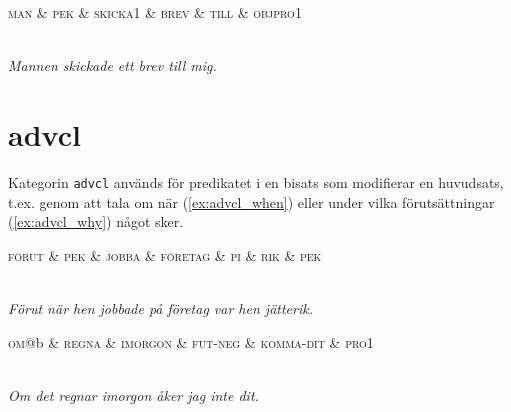 \documentclass[11pt,a4paper]{article}
\begin{document}
\begin{example}
\label{ex:case_obj}
\begin{dependency}[theme = simple]
   \begin{deptext}[column sep=1em]
      \textsc{man} \& \textsc{pek} \& \textsc{skicka1} \& \textsc{brev} \& \textsc{till} \& \textsc{objpro1} \\
   \end{deptext}
\end{dependency}
\\
\textit{Mannen skickade ett brev till mig.}
\end{example}

\section{advcl}
\label{sec:advcl}
Kategorin \texttt{advcl} används för predikatet i en bisats som modifierar en huvudsats, t.ex. genom att tala om när (\ref{ex:advcl_when}) eller under vilka förutsättningar (\ref{ex:advcl_why}) något sker.

\begin{example}
\label{ex:advcl_when}
\begin{dependency}[theme = simple]
   \begin{deptext}[column sep=1em]
      \textsc{förut} \& \textsc{pek} \& \textsc{jobba} \& \textsc{företag} \& \textsc{pi} \& \textsc{rik} \& \textsc{pek} \\
   \end{deptext}
\end{dependency}
\\
\textit{Förut när hen jobbade på företag var hen jätterik.}
\end{example}

\begin{example}
\label{ex:advcl_why}
\begin{dependency}[theme = simple]
   \begin{deptext}[column sep=1em]
      \textsc{om}@b \& \textsc{regna} \& \textsc{imorgon} \& \textsc{fut-neg} \& \textsc{komma-dit} \& \textsc{pro1}  \\
   \end{deptext}
\end{dependency}
\\
\textit{Om det regnar imorgon åker jag inte dit.}
\end{example}
\end{document}

